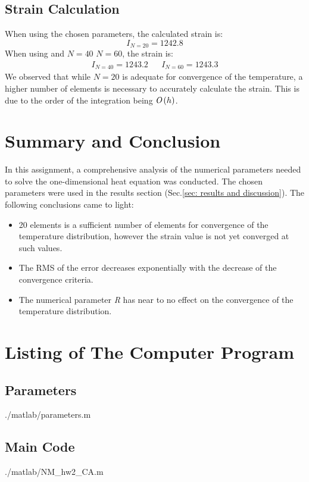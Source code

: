 \documentclass[11pt, a4paper]{article}
\begin{document}
\newpage
\subsection{Strain Calculation}
When using the chosen parameters, the calculated strain is:
\begin{equation}
    I_{N=20}=1242.8
\end{equation}
When using and $N=40$ $N=60$, the strain is:
\begin{equation}
    \begin{matrix}
        I_{N=40}=1243.2 && I_{N=60}=1243.3
    \end{matrix}
\end{equation}
We observed that while $N = 20$ is adequate for convergence of the temperature, a higher number of elements is necessary to accurately calculate the strain. This is due to the order of the integration being $\emph{O}\left(h\right)$. 

\section{Summary and Conclusion}
In this assignment, a comprehensive analysis of the numerical parameters needed to solve the one-dimensional heat equation was conducted. The chosen parameters were used in the results section (Sec.\ref{sec: results and discussion}). The following conclusions came to light:
\begin{itemize}
    \item 20 elements is a sufficient number of elements for convergence of the temperature distribution, however the strain value is not yet converged at such values.
    \item The RMS of the error decreases exponentially with the decrease of the convergence criteria.
    \item The numerical parameter \emph{R} has near to no effect on the convergence of the temperature distribution.
\end{itemize}

\newpage
\appendix
\section{Listing of The Computer Program}
\subsection{Parameters}
\begin{lstinputlisting}[captionpos=b,stringstyle=\color{magenta},frame=single, numbers=left, style=MatLab-editor, basicstyle=\mlttfamily\small, caption={Parameters file},mlshowsectionrules=true]{./matlab/parameters.m}
\end{lstinputlisting}

\subsection{Main Code}
\begin{lstinputlisting}[captionpos=b,stringstyle=\color{magenta},frame=single, numbers=left, style=MatLab-editor, basicstyle=\mlttfamily\small, caption={The main file},mlshowsectionrules=true]{./matlab/NM_hw2_CA.m}
\end{lstinputlisting}
\end{document}
